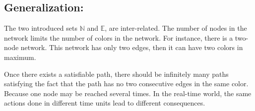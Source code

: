 \vspace{2mm}

\subsection*{Generalization:}
The two introduced sets $\mathbb{N}$ and $\mathbb{E}$, are inter-related. The number of nodes in the network limits the number of colors in the network. For instance, there is a two-node network. This network has only two edges, then it can have two colors in maximum.

Once there exists a satisfiable path, there should be infinitely many paths satisfying the fact that the path has no two consecutive edges in the same color. Because one node may be reached several times. In the real-time world, the same actions done in different time units lead to different consequences.



